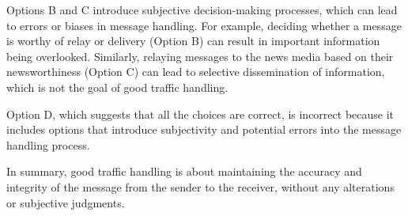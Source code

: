 Options B and C introduce subjective decision-making processes, which can lead to errors or biases in message handling. For example, deciding whether a message is worthy of relay or delivery (Option B) can result in important information being overlooked. Similarly, relaying messages to the news media based on their newsworthiness (Option C) can lead to selective dissemination of information, which is not the goal of good traffic handling.

Option D, which suggests that all the choices are correct, is incorrect because it includes options that introduce subjectivity and potential errors into the message handling process.

In summary, good traffic handling is about maintaining the accuracy and integrity of the message from the sender to the receiver, without any alterations or subjective judgments.

